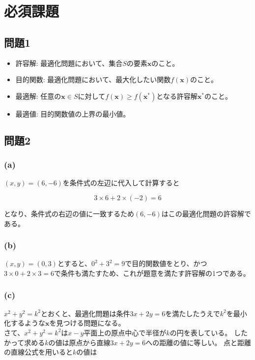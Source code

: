 \section{必須課題}
\subsection{問題1}
\begin{itemize}
    \item 許容解: 最適化問題において、集合\(S\)の要素\(\bm{x}\)のこと。
    \item 目的関数: 最適化問題において、最大化したい関数\(f(\bm{x})\)のこと。
    \item 最適解: 任意の\(\bm{x} \in S\)に対して\(f(\bm{x}) \geq f(\bm{x}^*)\)となる許容解\(\bm{x}^*\)のこと。
    \item 最適値: 目的関数値の上界の最小値。
\end{itemize}

\subsection{問題2}
\subsubsection{(a)}
\hspace{1em}\((x, y) = (6, -6)\)を条件式の左辺に代入して計算すると

\begin{equation}
    3 \times 6 +2 \times (-2) = 6
\end{equation}

\noindent となり、条件式の右辺の値に一致するため\((6, -6)\)はこの最適化問題の許容解である。

\subsubsection{(b)}
\hspace{1em}\((x, y) = (0, 3)\)とすると、\(0^2 + 3^2 = 9\)で目的関数値をとり、かつ\(3 \times 0 + 2 \times 3 = 6\)で条件も満たすため、これが題意を満たす許容解の1つである。

\subsubsection{(c)}
\hspace{1em}\(x^2 + y^2  = k^2\)とおくと、最適化問題は条件\(3x + 2y = 6\)を満たしたうえで\(k^2\)を最小化するような\(\bm{x}\)を見つける問題になる。 \\
\hspace{1em}さて、\(x^2 + y^2 = k^2\)は\(x-y\)平面上の原点中心で半径が\(k\)の円を表している。
したかって求める\(k\)の値は原点から直線\(3x + 2y = 6\)への距離の値に等しい。
点と距離の直線公式を用いると\(k\)の値は

